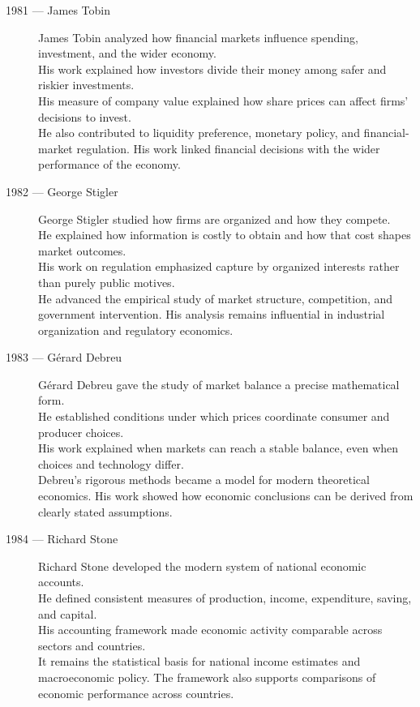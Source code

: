 \documentclass[12pt]{report}
\begin{document}
{\begin{description}
\item[1981 --- James Tobin]
James Tobin analyzed how financial markets influence spending, investment, and the wider economy.\\
His work explained how investors divide their money among safer and riskier investments.\\
His measure of company value explained how share prices can affect firms' decisions to invest.\\
He also contributed to liquidity preference, monetary policy, and financial-market regulation. His work linked financial decisions with the wider performance of the economy.

\item[1982 --- George Stigler]
George Stigler studied how firms are organized and how they compete.\\
He explained how information is costly to obtain and how that cost shapes market outcomes.\\
His work on regulation emphasized capture by organized interests rather than purely public motives.\\
He advanced the empirical study of market structure, competition, and government intervention. His analysis remains influential in industrial organization and regulatory economics.

\item[1983 --- Gérard Debreu]
Gérard Debreu gave the study of market balance a precise mathematical form.\\
He established conditions under which prices coordinate consumer and producer choices.\\
His work explained when markets can reach a stable balance, even when choices and technology differ.\\
Debreu's rigorous methods became a model for modern theoretical economics. His work showed how economic conclusions can be derived from clearly stated assumptions.

\item[1984 --- Richard Stone]
Richard Stone developed the modern system of national economic accounts.\\
He defined consistent measures of production, income, expenditure, saving, and capital.\\
His accounting framework made economic activity comparable across sectors and countries.\\
It remains the statistical basis for national income estimates and macroeconomic policy. The framework also supports comparisons of economic performance across countries.


\end{description}}
\end{document}
